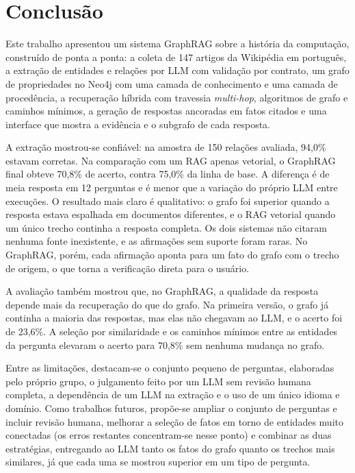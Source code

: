 
\section{Conclusão}

Este trabalho apresentou um sistema GraphRAG sobre a história da computação, construído de ponta a ponta: a coleta de 147 artigos da Wikipédia em português, a extração de entidades e relações por LLM com validação por contrato, um grafo de propriedades no Neo4j com uma camada de conhecimento e uma camada de procedência, a recuperação híbrida com travessia \emph{multi-hop}, algoritmos de grafo e caminhos mínimos, a geração de respostas ancoradas em fatos citados e uma interface que mostra a evidência e o subgrafo de cada resposta.

A extração mostrou-se confiável: na amostra de 150 relações avaliada, 94,0\% estavam corretas. Na comparação com um RAG apenas vetorial, o GraphRAG final obteve 70,8\% de acerto, contra 75,0\% da linha de base. A diferença é de meia resposta em 12 perguntas e é menor que a variação do próprio LLM entre execuções. O resultado mais claro é qualitativo: o grafo foi superior quando a resposta estava espalhada em documentos diferentes, e o RAG vetorial quando um único trecho continha a resposta completa. Os dois sistemas não citaram nenhuma fonte inexistente, e as afirmações sem suporte foram raras. No GraphRAG, porém, cada afirmação aponta para um fato do grafo com o trecho de origem, o que torna a verificação direta para o usuário.

A avaliação também mostrou que, no GraphRAG, a qualidade da resposta depende mais da recuperação do que do grafo. Na primeira versão, o grafo já continha a maioria das respostas, mas elas não chegavam ao LLM, e o acerto foi de 23,6\%. A seleção por similaridade e os caminhos mínimos entre as entidades da pergunta elevaram o acerto para 70,8\% sem nenhuma mudança no grafo.

Entre as limitações, destacam-se o conjunto pequeno de perguntas, elaboradas pelo próprio grupo, o julgamento feito por um LLM sem revisão humana completa, a dependência de um LLM na extração e o uso de um único idioma e domínio. Como trabalhos futuros, propõe-se ampliar o conjunto de perguntas e incluir revisão humana, melhorar a seleção de fatos em torno de entidades muito conectadas (os erros restantes concentram-se nesse ponto) e combinar as duas estratégias, entregando ao LLM tanto os fatos do grafo quanto os trechos mais similares, já que cada uma se mostrou superior em um tipo de pergunta.
